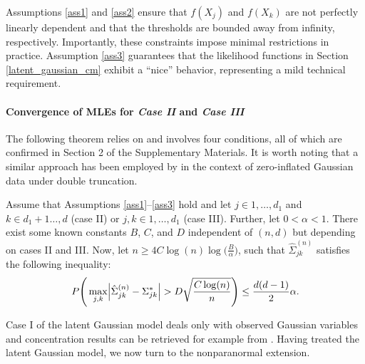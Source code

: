 Assumptions \ref{ass1} and \ref{ass2} ensure that $f(X_j)$ and $f(X_k)$ are not perfectly linearly dependent and that the thresholds are bounded away from infinity, respectively. Importantly, these constraints impose minimal restrictions in practice. Assumption \ref{ass3} guarantees that the likelihood functions in Section \ref{latent_gaussian_cm} exhibit a ``nice'' behavior, representing a mild technical requirement.

\paragraph{Convergence of MLEs for \textit{Case II} and \textit{Case III}}
The following theorem relies on \citet{Mei18} and involves four conditions, all of which are confirmed in Section 2 of the Supplementary Materials. It is worth noting that a similar approach has been employed by \citet{Anne19} in the context of zero-inflated Gaussian data under double truncation.

\begin{theorem}\label{uniform_convergence}
    Assume that Assumptions \ref{ass1}--\ref{ass3} hold and let $j \in 1, \dots, d_1$ and $k \in d_1+1 \dots, d$ (case II) or $j,k \in 1, \dots, d_1$ (case III). Further, let $0 < \alpha < 1$. There exist some known constants $B$, $C$, and $D$ independent of $(n,d)$ but depending on cases II and III. Now, let $n \geq 4 C \log(n) \log\Big(\frac{B}{\alpha}\Big)$, such that $\hat{\Sigma}_{jk}^{(n)}$ satisfies the following inequality:
    \begin{equation}
        P\Bigg(\max_{j,k}\abs{\hat{\Sigma}_{jk}^{(n)} - \Sigma_{jk}^{*}} > D\sqrt{\frac{C \log(n)}{n} }\Bigg) \leq \frac{d(d-1)}{2}\alpha.
    \end{equation}
\end{theorem}
\noindent Case I of the latent Gaussian model deals only with observed Gaussian variables and concentration results can be retrieved for example from \citet{Ravikumar11}. Having treated the latent Gaussian model, we now turn to the nonparanormal extension.


